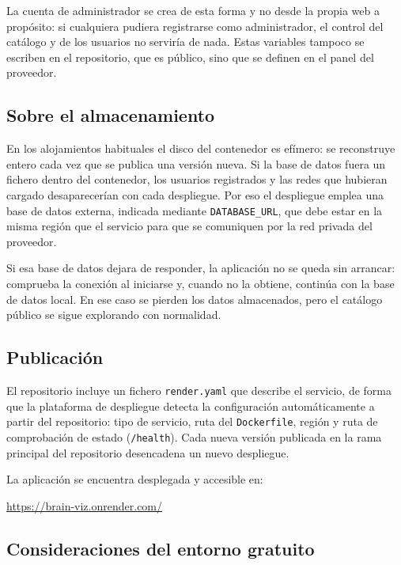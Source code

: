 La cuenta de administrador se crea de esta forma y no desde la propia web a propósito: si cualquiera
pudiera registrarse como administrador, el control del catálogo y de los usuarios no serviría de
nada. Estas variables tampoco se escriben en el repositorio, que es público, sino que se definen en
el panel del proveedor.

\subsection{Sobre el almacenamiento}

En los alojamientos habituales el disco del contenedor es efímero: se reconstruye entero cada vez que
se publica una versión nueva. Si la base de datos fuera un fichero dentro del contenedor, los
usuarios registrados y las redes que hubieran cargado desaparecerían con cada despliegue. Por eso el
despliegue emplea una base de datos externa, indicada mediante \texttt{DATABASE\_URL}, que debe
estar en la misma región que el servicio para que se comuniquen por la red privada del proveedor.

Si esa base de datos dejara de responder, la aplicación no se queda sin arrancar: comprueba la
conexión al iniciarse y, cuando no la obtiene, continúa con la base de datos local. En ese caso se
pierden los datos almacenados, pero el catálogo público se sigue explorando con normalidad.

\subsection{Publicación}

El repositorio incluye un fichero \texttt{render.yaml} que describe el servicio, de forma que la
plataforma de despliegue detecta la configuración automáticamente a partir del repositorio: tipo de
servicio, ruta del \texttt{Dockerfile}, región y ruta de comprobación de estado (\texttt{/health}).
Cada nueva versión publicada en la rama principal del repositorio desencadena un nuevo despliegue.

La aplicación se encuentra desplegada y accesible en:

\begin{center}
	\url{https://brain-viz.onrender.com/}
\end{center}

\subsection{Consideraciones del entorno gratuito}

